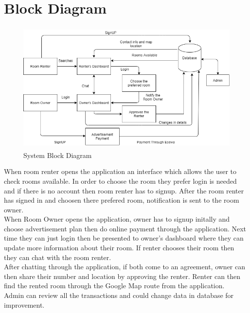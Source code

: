 \section{Block Diagram}
\begin{figure}[ht]
	\centering
	\includegraphics[width=\linewidth, height=250px]{Graphics/diagram.png}
	\caption{System Block Diagram }
\end{figure}
When room renter opens the application an interface which allows the user to check rooms available. In order to choose the room they prefer login is needed and if there is no account then room renter has to signup. After the room renter has signed in and choosen there prefered room, notification is sent to the room owner. \\
When Room Owner opens the application, owner has to signup initally and choose advertisement plan then do online payment through the application. Next time they can just login then be presented to owner's dashboard where they can update more information about their room. If renter chooses their room then they can chat with the room renter.\\
After chatting through the application, if both come to an agreement, owner can then share their number and location by approving the renter. Renter can then find the rented room through the Google Map route from the application.\\
Admin can review all the transactions and could change data in database for improvement.\\
